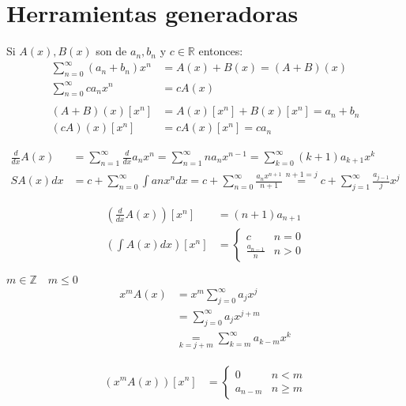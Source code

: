 \documentclass[../main.tex]{subfiles}
\begin{document}
\chapter{Herramientas generadoras}%

\thispagestyle{fancy}

Si $A(x),B(x)$ son 
de $a_n,b_n$ y $c\in\mathbb{R}$ entonces:
\begin{align*}
	\sum_{n=0}^\infty
	(a_n+b_n)
	x^n
	&=
	A(x)+B(x) = (A+B)(x)\\
	\sum_{n=0}^\infty
	ca_nx^n &= cA(x)\\
	\\
	(A+B)(x)[x^n] &= A(x)[x^n]+B(x)[x^n]=a_n+b_n\\
	(cA)(x)[x^n] &= cA(x)[x^n] = ca_n
\end{align*}

\begin{align*}
	\frac{d}{dx} A(x)
	&= \sum_{n=1}^\infty
	\frac{d}{dx} a_nx^n
	= \sum_{n=1}^\infty
	na_nx^{n-1}
	= \sum_{k=0}^\infty
	(k+1)a_{k+1}x^k\\
	SA(x)dx &=
	c+
	\sum_{n=0}^\infty
	\int anx^ndx
	= c+
	\sum_{n=0}^\infty
	\frac{a_nx^{n+1}}{n+1}
	\overset
	{
		n+1=j
	}
	{
		=
	}
	c+
	\sum_{j=1}^\infty
	\frac{a_{j-1}}{j} x^j
\end{align*}

\begin{align*}
	\left(
		\frac{d}{dx} A(x)
	\right)
	[x^n] &= (n+1)a_{n+1}\\
	\left(
		\int A(x)dx
	\right)
	[x^n] &=
	\begin{cases}
		c &n=0\\
		\frac{a_{n-1}}{n} &n > 0
	\end{cases}
\end{align*}

$m\in\mathbb{Z} \quad m \leq 0$
\begin{align*}
	x^m A(x) &= x^m
	\sum_{j=0}^\infty
	a_jx^j\\
	&=
	\sum_{j=0}^\infty
	a_jx^{j+m}\\
	&
	\underset
	{
		k=j+m
	}
	{
		=
	}
	\sum_{k=m}^\infty
	a_{k-m}x^k
\end{align*}

\begin{align*}
	(x^m A(x))[x^n] &=
	\begin{cases}
		0 &n < m\\
		a_{n-m} &n \geq m
	\end{cases}
\end{align*}
\end{document}
